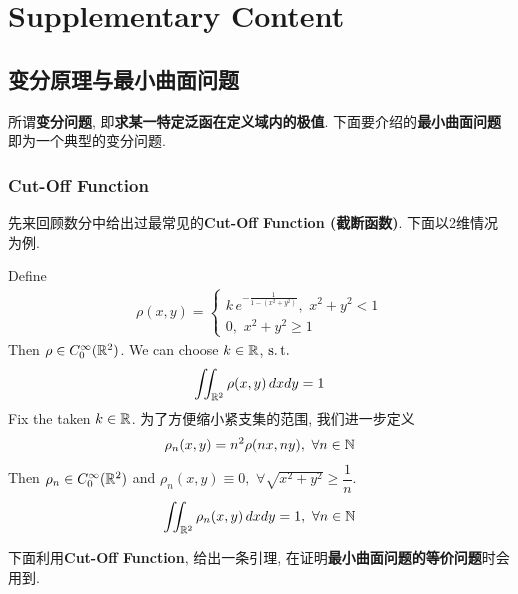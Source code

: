 \ifx\allfiles\undefined


	\else
	\fi
\appendix
\chapter{Supplementary Content}\label{appendix A}

\section{变分原理与最小曲面问题}
	所谓\textbf{变分问题}, 即\textbf{求某一特定泛函在定义域内的极值}. 下面要介绍的\textbf{最小曲面问题}即为一个典型的变分问题.  
	
\subsection{Cut-Off Function}
	先来回顾数分中给出过最常见的\textbf{Cut-Off Function (截断函数)}. 下面以2维情况为例. 
	
	\begin{example}\label{ex A.1.1}
		Define 
		\begin{align*}
			\rho(x , y) = 
			\begin{cases}
				k \, e^{-\tfrac{1}{1 - (x^2 + y^2)}} , \,\, x^2 + y^2 < 1 \\
				0 , \,\, x^2 + y^2 \geq 1
			\end{cases}
		\end{align*}
		Then $\rho \in C_{0}^{\infty} (\mathbb{R}^2)$. We can choose $k \in \mathbb{R}$, $\operatorname{s.t.}$
		\begin{align*}
			\iint_{\mathbb{R}^2} \rho(x , y) \, dx dy = 1
		\end{align*}
		Fix the taken $k \in \mathbb{R}$. 为了方便缩小紧支集的范围, 我们进一步定义
		\begin{align*}
			\rho_{n}(x , y) = n^2 \rho(nx , ny) , \,\, \forall n \in \mathbb{N}
		\end{align*}
		Then $\rho_n \in C^{\infty}_0 (\mathbb{R}^2)$ and $\rho_{n}(x , y) \equiv 0 , \,\, \forall \sqrt{x^2 + y^2} \geq \dfrac{1}{n}$.
		\begin{align*}
			\iint_{\mathbb{R}^2} \rho_{n}(x , y) \, dxdy = 1 , \,\, \forall n \in \mathbb{N}
		\end{align*}
	\end{example}
	
	\vspace*{4em}
	
	下面利用\textbf{Cut-Off Function}, 给出一条引理, 在证明\textbf{最小曲面问题的等价问题}时会用到. 
	
